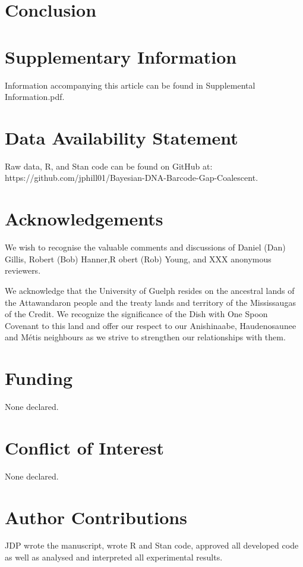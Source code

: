 \documentclass[12pt]{article}
\begin{document}
\section{Conclusion}


\newpage

\section*{Supplementary Information}

Information accompanying this article can be found in Supplemental Information.pdf.

\section*{Data Availability Statement}

Raw data, R, and Stan code can be found on GitHub at: \\ https://github.com/jphill01/Bayesian-DNA-Barcode-Gap-Coalescent.

\section*{Acknowledgements}

We wish to recognise the valuable comments and discussions of Daniel (Dan) Gillis, Robert (Bob) Hanner,R obert (Rob) Young, and XXX anonymous reviewers.

We acknowledge that the University of Guelph resides on the ancestral lands of the Attawandaron people and the treaty lands and territory of the Mississaugas of the Credit. We recognize the significance of the Dish with One Spoon Covenant to this land and offer our respect to our Anishinaabe, Haudenosaunee and M{\'e}tis neighbours as we strive to strengthen our relationships with them.

\section*{Funding}

None declared.

\section*{Conflict of Interest}

None declared.

\section*{Author Contributions}

JDP wrote the manuscript, wrote R and Stan code, approved all developed code as well as analysed and interpreted all experimental results. 



\end{document}

